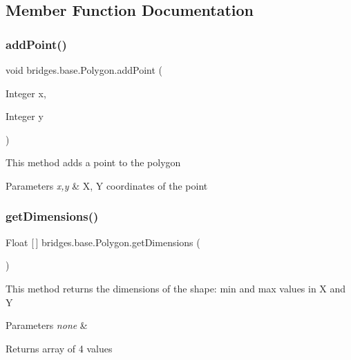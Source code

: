 \subsection{Member Function Documentation}
\mbox{\label{classbridges_1_1base_1_1_polygon_a23af8508f5ef7c2bbe0784264ee86e16}} 
\subsubsection{\texorpdfstring{add\+Point()}{addPoint()}}
{\footnotesize\ttfamily void bridges.\+base.\+Polygon.\+add\+Point (\begin{DoxyParamCaption}\item[{Integer}]{x,  }\item[{Integer}]{y }\end{DoxyParamCaption})}

This method adds a point to the polygon


\begin{DoxyParams}{Parameters}
{\em x,y} & X, Y coordinates of the point \\
\hline
\end{DoxyParams}
\mbox{\label{classbridges_1_1base_1_1_polygon_ae6e7440de0d3de9084f924e08f515a67}} 
\subsubsection{\texorpdfstring{get\+Dimensions()}{getDimensions()}}
{\footnotesize\ttfamily Float \mbox{[}$\,$\mbox{]} bridges.\+base.\+Polygon.\+get\+Dimensions (\begin{DoxyParamCaption}{ }\end{DoxyParamCaption})}

This method returns the dimensions of the shape\+: min and max values in X and Y


\begin{DoxyParams}{Parameters}
{\em none} & \\
\hline
\end{DoxyParams}
\begin{DoxyReturn}{Returns}
array of 4 values 
\end{DoxyReturn}
\mbox{\label{classbridges_1_1base_1_1_polygon_a12489d762f32ce5259ae6640ad95f188}} 
